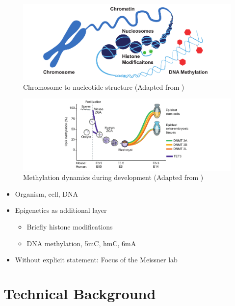 \begin{figure}[h]
	\centering
	\includegraphics[width=1.0\textwidth]{figures/intro/chromatin.pdf}
	\captionsetup{format=plain}
	\caption[Structure]{Chromosome to nucleotide structure (Adapted from \cite{zymo2020})}
	\label{fig:intro:chromatin}
\end{figure}

\begin{figure}[h]
	\centering
	\includegraphics[width=1.0\textwidth]{figures/intro/methylation.pdf}
	\captionsetup{format=plain}
	\caption[DNA methylation dynamics]{Methylation dynamics during development (Adapted from \cite{Greenberg2019})}
	\label{fig:intro:methylation}
\end{figure}

\begin{itemize}
    \item Organism, cell, DNA
    \item Epigenetics as additional layer
    \begin{itemize}
        \item Briefly histone modifications
        \item DNA methylation, 5mC, hmC, 6mA
    \end{itemize}
    \item Without explicit statement: Focus of the Meissner lab
\end{itemize}




\section{Technical Background}
\label{sec:intro:sequencing}

